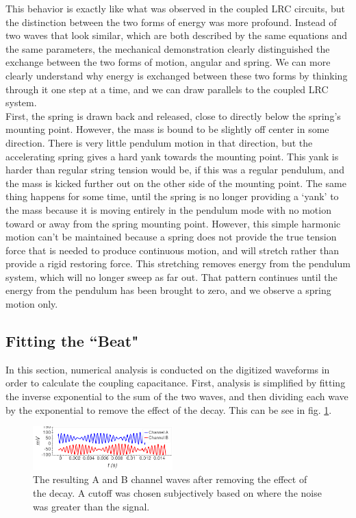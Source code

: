 \documentclass[aps,prl,reprint]{revtex4-2}
\begin{document}
This behavior is exactly like what was observed in the coupled LRC circuits,
but the distinction between the two forms of energy was more profound.
Instead of two waves that look similar, which are both described by the same
equations and the same parameters, the mechanical demonstration clearly
distinguished the exchange between the two forms of motion, angular and spring.
We can more clearly understand why energy is exchanged between these two
forms by thinking through it one step at a time, and we can draw parallels
to the coupled LRC system.\\

First, the spring is drawn back and released, close to directly below the
spring's mounting point. However, the mass is bound to be slightly off
center in some direction. There is very little pendulum motion in that
direction, but the accelerating spring gives a hard yank towards the
mounting point. This yank is harder than regular string tension would be,
if this was a regular pendulum, and the mass is kicked further out on
the other side of the mounting point. The same thing happens for some time,
until the spring is no longer providing a `yank' to the mass because it
is moving entirely in the pendulum mode with no motion toward or away from
the spring mounting point. However, this simple harmonic motion can't be
maintained because a spring does not provide the true tension force that
is needed to produce continuous motion, and will stretch rather than provide
a rigid restoring force. This stretching removes energy from the pendulum
system, which will no longer sweep as far out. That pattern continues until
the energy from the pendulum has been brought to zero, and we observe
a spring motion only. \\


\subsection{Fitting the ``Beat"}

In this section, numerical analysis is conducted on the digitized waveforms
in order to calculate the coupling capacitance. First, analysis is
simplified by fitting the inverse exponential to the sum of the two waves,
and then dividing each wave by the exponential to remove the effect of
the decay. This can be see in fig. \ref{nodecay}.

\begin{figure}[h]
\includegraphics[width=0.48\textwidth]{../Images/l6_channels_sans_decay.png}
\caption{\label{nodecay} The resulting A and B channel waves after removing
the effect of the decay. A cutoff was chosen subjectively based on where the
noise was greater than the signal. }
\end{figure}
\end{document}
